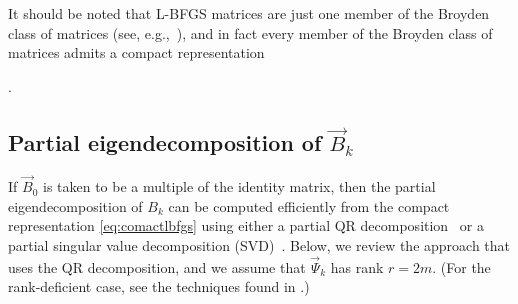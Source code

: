It should be noted that {\small L-BFGS} matrices are just one member of
the Broyden class of matrices (see, e.g.,~\cite{NocW99}),
and in fact every member of the Broyden class of matrices admits a
compact representation~{\cite{DeGuchyEM16,ErwayM15,LukV13}.


\subsection{Partial eigendecomposition of $ \vec{B}_k $}
\label{subsec:eigen}
If $ \vec{B}_0$ is taken to be a multiple of the identity matrix, then the partial
eigendecomposition of $B_k$ can be computed efficiently from the compact
representation \eqref{eq:comactlbfgs} using either a partial {\small QR}
decomposition~\cite{BurdakovLMTR16} or a partial singular
value decomposition ({\small SVD})~\cite{Lu92}.  Below, we review the
approach that uses the {\small QR} decomposition, and we assume
that $ \vec{\Psi}_k $ has rank $ r = 2m $.  (For the rank-deficient case,
see the techniques found in \cite{BurdakovLMTR16}.)

}
